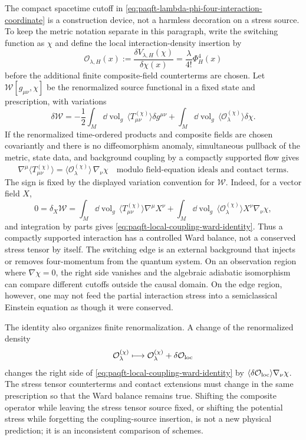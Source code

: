 The compact spacetime cutoff in
\eqref{eq:paqft-lambda-phi-four-interaction-coordinate} is a construction
device, not a harmless decoration on a stress source.  To keep the metric
notation separate in this paragraph, write the switching function as
\(\chi\) and define the local interaction-density insertion by
\begin{equation}
  \mathcal O_{\lambda,H}(x)
  :=
  \frac{\delta V_{\lambda,H}(\chi)}{\delta\chi(x)}
  =
  \frac{\lambda}{4!}\Phi_H^4(x)
  \label{eq:paqft-local-coupling-density}
\end{equation}
before the additional finite composite-field counterterms are chosen.  Let
\(\mathcal W[g_{\mu\nu},\chi]\) be the renormalized source functional in a
fixed state and prescription, with variations
\[
  \delta\mathcal W
  =
  -\frac12
  \int_M\dd\operatorname{vol}_g\,
  \langle T_{\mu\nu}^{(\chi)}\rangle\delta g^{\mu\nu}
  +
  \int_M\dd\operatorname{vol}_g\,
  \langle \mathcal O_\lambda^{(\chi)}\rangle\delta\chi .
\]
If the renormalized time-ordered products and composite fields are chosen
covariantly and there is no diffeomorphism anomaly, simultaneous pullback of
the metric, state data, and background coupling by a compactly supported flow
gives
\begin{equation}
  \nabla^\mu\langle T_{\mu\nu}^{(\chi)}\rangle
  =
  \langle \mathcal O_\lambda^{(\chi)}\rangle\,\nabla_\nu\chi
  \quad
  \text{modulo field-equation ideals and contact terms.}
  \label{eq:paqft-local-coupling-ward-identity}
\end{equation}
The sign is fixed by the displayed variation convention for
\(\mathcal W\).  Indeed, for a vector field \(X\),
\[
  0
  =
  \delta_X\mathcal W
  =
  \int_M\dd\operatorname{vol}_g\,
  \langle T_{\mu\nu}^{(\chi)}\rangle\nabla^\mu X^\nu
  +
  \int_M\dd\operatorname{vol}_g\,
  \langle\mathcal O_\lambda^{(\chi)}\rangle X^\nu\nabla_\nu\chi ,
\]
and integration by parts gives
\eqref{eq:paqft-local-coupling-ward-identity}.  Thus a compactly supported
interaction has a controlled Ward balance, not a conserved stress tensor by
itself.  The switching edge is an external background that injects or removes
four-momentum from the quantum system.  On an observation region where
\(\nabla\chi=0\), the right side vanishes and the algebraic adiabatic
isomorphism can compare different cutoffs outside the causal domain.  On the
edge region, however, one may not feed the partial interaction stress into a
semiclassical Einstein equation as though it were conserved.

The identity also organizes finite renormalization.  A change of the
renormalized density
\[
  \mathcal O_\lambda^{(\chi)}
  \longmapsto
  \mathcal O_\lambda^{(\chi)}+\delta\mathcal O_{\rm loc}
\]
changes the right side of
\eqref{eq:paqft-local-coupling-ward-identity} by
\(\langle\delta\mathcal O_{\rm loc}\rangle\nabla_\nu\chi\).  The stress tensor
counterterms and contact extensions must change in the same prescription so
that the Ward balance remains true.  Shifting the composite operator while
leaving the stress tensor source fixed, or shifting the potential stress while
forgetting the coupling-source insertion, is not a new physical prediction;
it is an inconsistent comparison of schemes.

